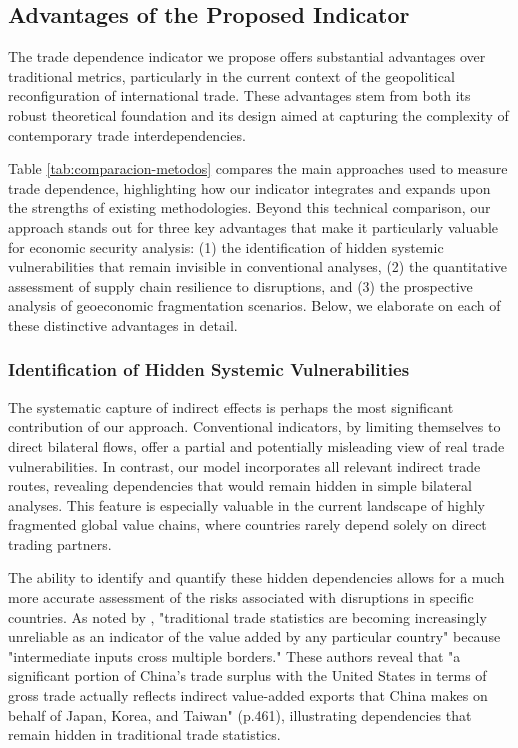\documentclass[final,1p,times,authoryear]{elsarticle}
\begin{document}
\subsection{Advantages of the Proposed Indicator}

The trade dependence indicator we propose offers substantial advantages over traditional metrics, particularly in the current context of the geopolitical reconfiguration of international trade. These advantages stem from both its robust theoretical foundation and its design aimed at capturing the complexity of contemporary trade interdependencies.

Table \ref{tab:comparacion-metodos} compares the main approaches used to measure trade dependence, highlighting how our indicator integrates and expands upon the strengths of existing methodologies. Beyond this technical comparison, our approach stands out for three key advantages that make it particularly valuable for economic security analysis: (1) the identification of hidden systemic vulnerabilities that remain invisible in conventional analyses, (2) the quantitative assessment of supply chain resilience to disruptions, and (3) the prospective analysis of geoeconomic fragmentation scenarios. Below, we elaborate on each of these distinctive advantages in detail.

\subsubsection{Identification of Hidden Systemic Vulnerabilities}

The systematic capture of indirect effects is perhaps the most significant contribution of our approach. Conventional indicators, by limiting themselves to direct bilateral flows, offer a partial and potentially misleading view of real trade vulnerabilities. In contrast, our model incorporates all relevant indirect trade routes, revealing dependencies that would remain hidden in simple bilateral analyses. This feature is especially valuable in the current landscape of highly fragmented global value chains, where countries rarely depend solely on direct trading partners.

The ability to identify and quantify these hidden dependencies allows for a much more accurate assessment of the risks associated with disruptions in specific countries. As noted by \citet{Koopman2014}, "traditional trade statistics are becoming increasingly unreliable as an indicator of the value added by any particular country" because "intermediate inputs cross multiple borders." These authors reveal that "a significant portion of China’s trade surplus with the United States in terms of gross trade actually reflects indirect value-added exports that China makes on behalf of Japan, Korea, and Taiwan" (p.461), illustrating dependencies that remain hidden in traditional trade statistics.
\end{document}
